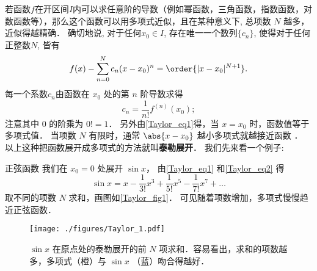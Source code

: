

若函数$f$在开区间$I$内可以求任意阶的导数（例如幂函数，三角函数，指数函数，对数函数等），那么这个函数可以用多项式近似，且在某种意义下, 总项数 $N$ 越多，近似得越精确． 确切地说, 对于任何$x_0\in I$, 存在唯一一个数列$\{c_n\}$, 使得对于任何正整数$N$, 皆有
\begin{equation}\label{Taylor_eq1}
f(x) -\sum_{n = 0}^N  c_n (x - x_0)^n=\order{|x-x_0|^{N+1}}.
\end{equation}
每一个系数$c_n$由函数在 $x_0$ 处的第 $n$ 阶导数求得
\begin{equation}\label{Taylor_eq2}
c_n = \frac{1}{n!} f^{(n)}(x_0);
\end{equation}
注意其中 0 的阶乘为 $0! = 1$． 另外由\autoref{Taylor_eq1}得，当 $x=x_0$ 时，函数值等于多项式值． 当项数 $N$ 有限时，通常 $\abs{x-x_0}$ 越小多项式就越接近函数 ． 以上这种把函数展开成多项式的方法就叫\textbf{泰勒展开}． 我们先来看一个例子:

\begin{example}{正弦函数}
我们在 $x_0=0$ 处展开 $\sin x$， 由\autoref{Taylor_eq1} 和\autoref{Taylor_eq2} 得
\begin{equation}\label{Taylor_eq3}
\sin x = x - \frac{1}{3!}{x^3} + \frac{1}{5!}{x^5} - \frac{1}{7!} x^7 + \ldots 
\end{equation}
取不同的项数 $N$ 求和，画图如\autoref{Taylor_fig1}． 可见随着项数增加，多项式慢慢趋近正弦函数．

\begin{figure}[ht]
\centering
\texttt{[image: ./figures/Taylor\_1.pdf]}
\caption{$\sin x$ 在原点处的泰勒展开的前 $N$ 项求和．容易看出，求和的项数越多，多项式（橙）与 $\sin x$ （蓝）吻合得越好．}\label{Taylor_fig1}
\end{figure}
\end{example}

